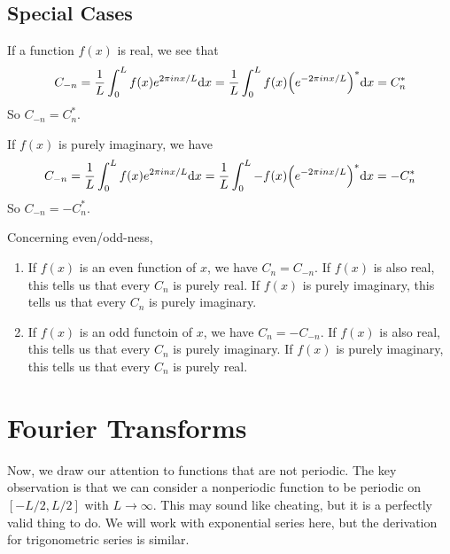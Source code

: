\subsection*{Special Cases}
If a function $f(x)$ is real, we see that
\[ C_{-n} = \frac{1}{L}\int_0^L f(x)e^{2\pi inx/L}\dd x = \frac{1}{L} \int_0^L f(x)\pqty{e^{-2\pi inx/L}}^*\dd x = C_n^*\]
So $C_{-n} = C_n^*$.

If $f(x)$ is purely imaginary, we have
\[ C_{-n} = \frac{1}{L}\int_0^L f(x)e^{2\pi inx/L}\dd x = \frac{1}{L} \int_0^L -f(x)\pqty{e^{-2\pi inx/L}}^*\dd x = -C_n^* \]
So $C_{-n} = -C_n^*$.

Concerning even/odd-ness, 
\begin{enumerate}
    \item If $f(x)$ is an even function of $x$, we have $C_n = C_{-n}$. If $f(x)$ is also real, this tells us that every $C_n$ is purely real. If $f(x)$ is purely imaginary, this tells us that every $C_n$ is purely imaginary.
    \item If $f(x)$ is an odd functoin of $x$, we have $C_n = -C_{-n}$. If $f(x)$ is also real, this tells us that every $C_n$ is purely imaginary. If $f(x)$ is purely imaginary, this tells us that every $C_n$ is purely real.
\end{enumerate}
\section{Fourier Transforms}
Now, we draw our attention to functions that are not periodic. The key observation is that we can consider a nonperiodic function to be periodic on $[-L/2, L/2]$ with $L\to \infty$. This may sound like cheating, but it is a perfectly valid thing to do. We will work with exponential series here, but the derivation for trigonometric series is similar.

